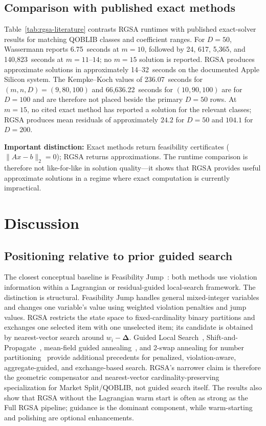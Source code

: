 \documentclass[11pt]{article}
\newcommand{\res}{\boldsymbol{\Delta}}
\begin{document}
\subsection{Comparison with published exact methods}

Table~\ref{tab:rgsa-literature} contrasts RGSA runtimes with published exact-solver results for matching QOBLIB classes and coefficient ranges. For $D=50$, Wassermann reports 6.75~seconds at $m=10$, followed by 24, 617, 5,365, and 140,823~seconds at $m=11$--$14$; no $m=15$ solution is reported. RGSA produces approximate solutions in approximately 14--32~seconds on the documented Apple Silicon system. The Kempke--Koch values of 236.07~seconds for $(m,n,D)=(9,80,100)$ and 66,636.22~seconds for $(10,90,100)$ are for $D=100$ and are therefore not placed beside the primary $D=50$ rows. At $m=15$, no cited exact method has reported a solution for the relevant classes; RGSA produces mean residuals of approximately $24.2$ for $D=50$ and $104.1$ for $D=200$.



\textbf{Important distinction:} Exact methods return feasibility certificates ($\|Ax-b\|_2=0$); RGSA returns approximations. The runtime comparison is therefore not like-for-like in solution quality---it shows that RGSA provides useful approximate solutions in a regime where exact computation is currently impractical.

\FloatBarrier
\section{Discussion}\label{sec:discussion}
\subsection{Positioning relative to prior guided search}
The closest conceptual baseline is Feasibility Jump~\cite{fj2023}: both methods use violation information within a Lagrangian or residual-guided local-search framework. The distinction is structural. Feasibility Jump handles general mixed-integer variables and changes one variable's value using weighted violation penalties and jump values. RGSA restricts the state space to fixed-cardinality binary partitions and exchanges one selected item with one unselected item; its candidate is obtained by nearest-vector search around $w_i-\res$. Guided Local Search~\cite{gls1999}, Shift-and-Propagate~\cite{berthold2015}, mean-field guided annealing~\cite{isakov2003}, and 2-swap annealing for number partitioning~\cite{johnson1991} provide additional precedents for penalized, violation-aware, aggregate-guided, and exchange-based search. RGSA's narrower claim is therefore the geometric compensator and nearest-vector cardinality-preserving specialization for Market Split/QOBLIB, not guided search itself. The results also show that RGSA without the Lagrangian warm start is often as strong as the Full RGSA pipeline; guidance is the dominant component, while warm-starting and polishing are optional enhancements.
\end{document}

